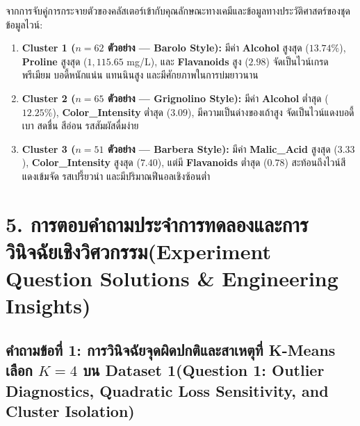 \documentclass[12pt,a4paper]{article}
\newcommand{\codevar}[1]{\textcolor{codeaccent}{\textbf{#1}}}
\begin{document}
จากการจับคู่การกระจายตัวของคลัสเตอร์เข้ากับคุณลักษณะทางเคมีและข้อมูลทางประวัติศาสตร์ของชุดข้อมูลไวน์:
\begin{enumerate}[leftmargin=1.5em, itemsep=2pt]
    \item \textbf{Cluster 1 ($n=62$ ตัวอย่าง — Barolo Style):} มีค่า \codevar{Alcohol} สูงสุด ($13.74\%$), \codevar{Proline} สูงสุด ($1,115.65$ mg/L), และ \codevar{Flavanoids} สูง ($2.98$) จัดเป็นไวน์เกรดพรีเมียม บอดี้หนักแน่น แทนนินสูง และมีศักยภาพในการบ่มยาวนาน
    \item \textbf{Cluster 2 ($n=65$ ตัวอย่าง — Grignolino Style):} มีค่า \codevar{Alcohol} ต่ำสุด ($12.25\%$), \codevar{Color\_Intensity} ต่ำสุด ($3.09$), มีความเป็นด่างของเถ้าสูง จัดเป็นไวน์แดงบอดี้เบา สดชื่น สีอ่อน รสสัมผัสดื่มง่าย
    \item \textbf{Cluster 3 ($n=51$ ตัวอย่าง — Barbera Style):} มีค่า \codevar{Malic\_Acid} สูงสุด ($3.33$), \codevar{Color\_Intensity} สูงสุด ($7.40$), แต่มี \codevar{Flavanoids} ต่ำสุด ($0.78$) สะท้อนถึงไวน์สีแดงเข้มจัด รสเปรี้ยวนำ และมีปริมาณฟีนอลเชิงซ้อนต่ำ
\end{enumerate}

\clearpage
\section*{5. การตอบคำถามประจำการทดลองและการวินิจฉัยเชิงวิศวกรรม\newline \large(Experiment Question Solutions \& Engineering Insights)}
\vspace{-0.6em}

\subsection*{คำถามข้อที่ 1: การวินิจฉัยจุดผิดปกติและสาเหตุที่ K-Means เลือก $K=4$ บน Dataset 1\newline \normalsize(Question 1: Outlier Diagnostics, Quadratic Loss Sensitivity, and Cluster Isolation)}
\vspace{-0.5em}
\end{document}

